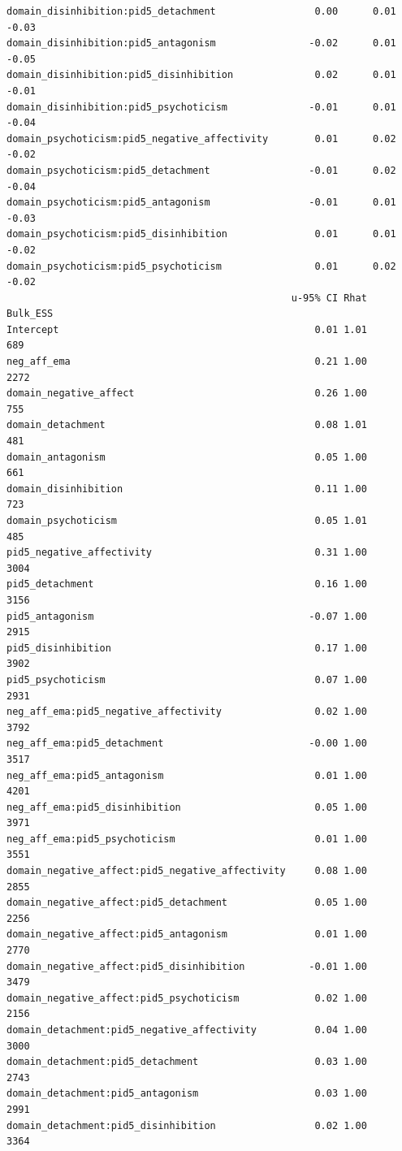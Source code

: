 \documentclass[
  11pt,
  a4paper,
  onecolumn]{article}
\begin{document}
\begin{verbatim}
domain_disinhibition:pid5_detachment                 0.00      0.01    -0.03
domain_disinhibition:pid5_antagonism                -0.02      0.01    -0.05
domain_disinhibition:pid5_disinhibition              0.02      0.01    -0.01
domain_disinhibition:pid5_psychoticism              -0.01      0.01    -0.04
domain_psychoticism:pid5_negative_affectivity        0.01      0.02    -0.02
domain_psychoticism:pid5_detachment                 -0.01      0.02    -0.04
domain_psychoticism:pid5_antagonism                 -0.01      0.01    -0.03
domain_psychoticism:pid5_disinhibition               0.01      0.01    -0.02
domain_psychoticism:pid5_psychoticism                0.01      0.02    -0.02
                                                 u-95% CI Rhat Bulk_ESS
Intercept                                            0.01 1.01      689
neg_aff_ema                                          0.21 1.00     2272
domain_negative_affect                               0.26 1.00      755
domain_detachment                                    0.08 1.01      481
domain_antagonism                                    0.05 1.00      661
domain_disinhibition                                 0.11 1.00      723
domain_psychoticism                                  0.05 1.01      485
pid5_negative_affectivity                            0.31 1.00     3004
pid5_detachment                                      0.16 1.00     3156
pid5_antagonism                                     -0.07 1.00     2915
pid5_disinhibition                                   0.17 1.00     3902
pid5_psychoticism                                    0.07 1.00     2931
neg_aff_ema:pid5_negative_affectivity                0.02 1.00     3792
neg_aff_ema:pid5_detachment                         -0.00 1.00     3517
neg_aff_ema:pid5_antagonism                          0.01 1.00     4201
neg_aff_ema:pid5_disinhibition                       0.05 1.00     3971
neg_aff_ema:pid5_psychoticism                        0.01 1.00     3551
domain_negative_affect:pid5_negative_affectivity     0.08 1.00     2855
domain_negative_affect:pid5_detachment               0.05 1.00     2256
domain_negative_affect:pid5_antagonism               0.01 1.00     2770
domain_negative_affect:pid5_disinhibition           -0.01 1.00     3479
domain_negative_affect:pid5_psychoticism             0.02 1.00     2156
domain_detachment:pid5_negative_affectivity          0.04 1.00     3000
domain_detachment:pid5_detachment                    0.03 1.00     2743
domain_detachment:pid5_antagonism                    0.03 1.00     2991
domain_detachment:pid5_disinhibition                 0.02 1.00     3364

\end{verbatim}
\end{document}
